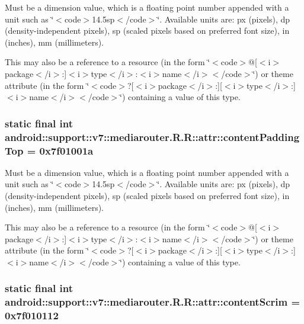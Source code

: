 Must be a dimension value, which is a floating point number appended with a unit such as \char`\"{}$<$code$>$14.5sp$<$/code$>$\char`\"{}. Available units are: px (pixels), dp (density-independent pixels), sp (scaled pixels based on preferred font size), in (inches), mm (millimeters). 

This may also be a reference to a resource (in the form \char`\"{}$<$code$>$@\mbox{[}$<$i$>$package$<$/i$>$:\mbox{]}$<$i$>$type$<$/i$>$:$<$i$>$name$<$/i$>$$<$/code$>$\char`\"{}) or theme attribute (in the form \char`\"{}$<$code$>$?\mbox{[}$<$i$>$package$<$/i$>$:\mbox{]}\mbox{[}$<$i$>$type$<$/i$>$:\mbox{]}$<$i$>$name$<$/i$>$$<$/code$>$\char`\"{}) containing a value of this type. \hypertarget{classandroid_1_1support_1_1v7_1_1mediarouter_1_1_r_1_1attr_d3eac08ab8842d0ef72b133b25f37312}{
\subsubsection[{contentPaddingTop}]{\setlength{\rightskip}{0pt plus 5cm}static final int android::support::v7::mediarouter.R.R::attr::contentPaddingTop = 0x7f01001a}}
\label{classandroid_1_1support_1_1v7_1_1mediarouter_1_1_r_1_1attr_d3eac08ab8842d0ef72b133b25f37312}


Must be a dimension value, which is a floating point number appended with a unit such as \char`\"{}$<$code$>$14.5sp$<$/code$>$\char`\"{}. Available units are: px (pixels), dp (density-independent pixels), sp (scaled pixels based on preferred font size), in (inches), mm (millimeters). 

This may also be a reference to a resource (in the form \char`\"{}$<$code$>$@\mbox{[}$<$i$>$package$<$/i$>$:\mbox{]}$<$i$>$type$<$/i$>$:$<$i$>$name$<$/i$>$$<$/code$>$\char`\"{}) or theme attribute (in the form \char`\"{}$<$code$>$?\mbox{[}$<$i$>$package$<$/i$>$:\mbox{]}\mbox{[}$<$i$>$type$<$/i$>$:\mbox{]}$<$i$>$name$<$/i$>$$<$/code$>$\char`\"{}) containing a value of this type. \hypertarget{classandroid_1_1support_1_1v7_1_1mediarouter_1_1_r_1_1attr_8f20f2f3ee0479c2d8ae423ee2d73d04}{
\subsubsection[{contentScrim}]{\setlength{\rightskip}{0pt plus 5cm}static final int android::support::v7::mediarouter.R.R::attr::contentScrim = 0x7f010112}}
\label{classandroid_1_1support_1_1v7_1_1mediarouter_1_1_r_1_1attr_8f20f2f3ee0479c2d8ae423ee2d73d04}


